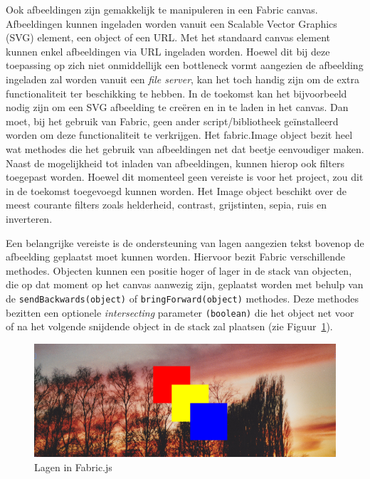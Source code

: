 Ook afbeeldingen zijn gemakkelijk te manipuleren in een Fabric canvas. Afbeeldingen kunnen ingeladen worden vanuit een Scalable Vector Graphics (SVG) element, een object of een URL. Met het standaard canvas element kunnen enkel afbeeldingen via URL ingeladen worden. Hoewel dit bij deze toepassing op zich niet onmiddellijk een bottleneck vormt aangezien de afbeelding ingeladen zal worden vanuit een \textit{file server}, kan het toch handig zijn om de extra functionaliteit ter beschikking te hebben. In de toekomst kan het bijvoorbeeld nodig zijn om een SVG afbeelding te cre\"{e}ren en in te laden in het canvas. Dan moet, bij het gebruik van Fabric, geen ander script/bibliotheek ge\"{i}nstalleerd worden om deze functionaliteit te verkrijgen. Het fabric.Image object bezit heel wat methodes die het gebruik van afbeeldingen net dat beetje eenvoudiger maken. %
Naast de mogelijkheid tot inladen van afbeeldingen, kunnen hierop ook filters toegepast worden. Hoewel dit momenteel geen vereiste is voor het project, zou dit in de toekomst toegevoegd kunnen worden. Het Image object beschikt over de meest courante filters zoals helderheid, contrast, grijstinten, sepia, ruis en inverteren.  

Een belangrijke vereiste is de ondersteuning van lagen aangezien tekst bovenop de afbeelding geplaatst moet kunnen worden. Hiervoor bezit Fabric verschillende methodes. Objecten kunnen een positie hoger of lager in de stack van objecten, die op dat moment op het canvas aanwezig zijn, geplaatst worden met behulp van de \lstinline|sendBackwards(object)| of \lstinline|bringForward(object)| methodes. Deze methodes bezitten een optionele \textit{intersecting} parameter \texttt{(boolean)} die het object net voor of na het volgende snijdende object in de stack zal plaatsen (zie Figuur~\ref{fig:FabricLayers}). 

\begin{figure}[H]
	\centering
	\includegraphics[width=1\textwidth]{Figuren/FabricLayers.png}
	\caption{Lagen in Fabric.js} %
	\label{fig:FabricLayers}
\end{figure} 

